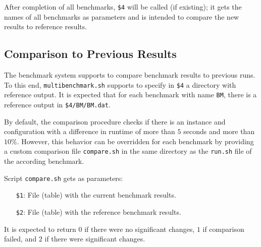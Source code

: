\documentclass[a4paper]{article}
\begin{document}
			After completion of all benchmarks, {\tt \$4} will be called (if existing); it gets the names of all benchmarks as parameters
			and is intended to compare the new results to reference results.
					
		\subsection{Comparison to Previous Results}
					
			The benchmark system supports to compare benchmark results
			to previous runs.
			To this end, {\tt multibenchmark.sh}
			supports to specify in {\tt \$4} a directory with reference output.
			It is expected that for each benchmark with name {\tt BM},
			there is a reference output in {\tt \$4/BM/BM.dat}.
			
			By default, the comparison procedure checks if there is an
			instance and configuration with a difference in runtime of more than $5$ seconds and more than $10\%$.
			However, this behavior can be overridden for each benchmark
			by providing a custom comparison file {\tt compare.sh}
			in the same directory as the {\tt run.sh} file of the according benchmark.
			
			Script {\tt compare.sh} gets as parameters:
			    \begin{itemize}
					\item[{\tt \$1}:] File (table) with the current benchmark results.
					\item[{\tt \$2}:] File (table) with the reference benchmark results.
			    \end{itemize}
			
			It is expected to return $0$ if there were no significant changes,
			$1$ if comparison failed, and $2$ if there were significant changes.
\end{document}
